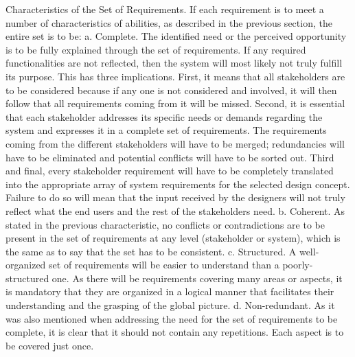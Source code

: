 Characteristics of the Set of Requirements. 	If each requirement is to meet a number of characteristics of abilities, as described in the previous section, the entire set is to be:
    a. Complete. The identified need or the perceived opportunity is to be fully explained through the set of requirements. If any required functionalities are not reflected, then the system will most likely not truly fulfill its purpose. This has three implications. First, it means that all stakeholders are to be considered because if any one is not considered and involved, it will then follow that all requirements coming from it will be missed. Second, it is essential that each stakeholder addresses its specific needs or demands regarding the system and expresses it in a complete set of requirements. The requirements coming from the different stakeholders will have to be merged; redundancies will have to be eliminated and potential conflicts will have to be sorted out. Third and final, every stakeholder requirement will have to be completely translated into the appropriate array of system requirements for the selected design concept. Failure to do so will mean that the input received by the designers will not truly reflect what the end users and the rest of the stakeholders need.
    b. Coherent. As stated in the previous characteristic, no conflicts or contradictions are to be present in the set of requirements at any level (stakeholder or system), which is the same as to say that the set has to be consistent.
    c. Structured. A well-organized set of requirements will be easier to understand than a poorly-structured one. As there will be requirements covering many areas or aspects, it is mandatory that they are organized in a logical manner that facilitates their understanding and the grasping of the global picture.
    d. Non-redundant. As it was also mentioned when addressing the need for the set of requirements to be complete, it is clear that it should not contain any repetitions. Each aspect is to be covered just once.
